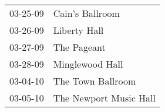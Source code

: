 \begin{supertabular}{p{0.25\columnwidth}p{0.75\columnwidth}}
 03-25-09 &         Cain's Ballroom \\
 03-26-09 &            Liberty Hall \\
 03-27-09 &             The Pageant \\
 03-28-09 &         Minglewood Hall \\
 03-04-10 &       The Town Ballroom \\
 03-05-10 &  The Newport Music Hall \\
\end{supertabular}
